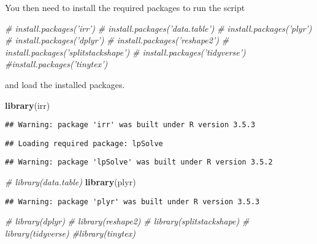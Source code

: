 \documentclass[]{article}
\newenvironment{Shaded}{\begin{snugshade}}{\end{snugshade}}
\newcommand{\KeywordTok}[1]{\textcolor[rgb]{0.13,0.29,0.53}{\textbf{#1}}}
\newcommand{\CommentTok}[1]{\textcolor[rgb]{0.56,0.35,0.01}{\textit{#1}}}
\newcommand{\NormalTok}[1]{#1}
\begin{document}
You then need to install the required packages to run the script

\begin{Shaded}
\begin{Highlighting}[]
\CommentTok{# install.packages('irr')}
\CommentTok{# install.packages('data.table')}
\CommentTok{# install.packages('plyr')}
\CommentTok{# install.packages('dplyr')}
\CommentTok{# install.packages('reshape2')}
\CommentTok{# install.packages('splitstackshape')}
\CommentTok{# install.packages('tidyverse')}
\CommentTok{#install.packages('tinytex')}
\end{Highlighting}
\end{Shaded}

and load the installed packages.

\begin{Shaded}
\begin{Highlighting}[]
 \KeywordTok{library}\NormalTok{(irr)}
\end{Highlighting}
\end{Shaded}

\begin{verbatim}
## Warning: package 'irr' was built under R version 3.5.3
\end{verbatim}

\begin{verbatim}
## Loading required package: lpSolve
\end{verbatim}

\begin{verbatim}
## Warning: package 'lpSolve' was built under R version 3.5.2
\end{verbatim}

\begin{Shaded}
\begin{Highlighting}[]
\CommentTok{# library(data.table)}
 \KeywordTok{library}\NormalTok{(plyr)}
\end{Highlighting}
\end{Shaded}

\begin{verbatim}
## Warning: package 'plyr' was built under R version 3.5.3
\end{verbatim}

\begin{Shaded}
\begin{Highlighting}[]
\CommentTok{# library(dplyr)}
\CommentTok{# library(reshape2)}
\CommentTok{# library(splitstackshape)}
\CommentTok{# library(tidyverse)}
\CommentTok{#library(tinytex)}
\end{Highlighting}
\end{Shaded}
\end{document}
